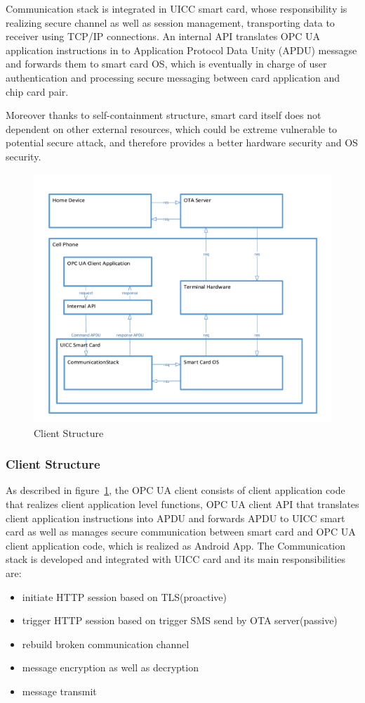 \documentclass[]{llncs}
\begin{document}
Communication stack is integrated in UICC smart card, whose responsibility is realizing secure channel as well as session management, transporting data to receiver using TCP/IP connections. An internal API translates OPC UA application instructions in to Application Protocol Data Unity (APDU) messagse and forwards them to smart card OS, which is eventually in charge of user authentication and processing secure messaging between card application and chip card pair. 

Moreover thanks to self-containment structure, smart card itself does not dependent on other external resources, which could be extreme vulnerable to potential secure attack, and therefore provides a better hardware security and OS security.

 \begin{figure}
	\centering
	\includegraphics[width=1.2\textwidth]{clientStructure}
		\caption[ ]{Client Structure}
	\label{fig:clientStructure}
\end{figure}
\subsubsection{Client Structure}
As described in figure~\ref{fig:clientStructure}, the OPC UA client consists of client application code that realizes client application level functions, OPC UA client API that translates client application instructions into APDU and forwards APDU to UICC smart card as well as  manages secure communication between smart card and OPC UA client application code, which is realized as Android  App. The Communication stack is developed and integrated with UICC card and its main responsibilities are:
\begin{itemize}
  \item initiate HTTP session based on TLS(proactive)
  \item trigger HTTP session based on trigger SMS send by OTA server(passive)
  \item rebuild broken communication channel
  \item message encryption as well as decryption
  \item message transmit
\end{itemize}
\end{document}
